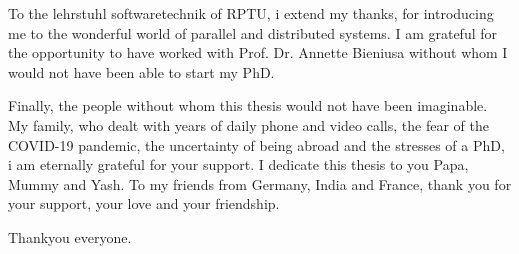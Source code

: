To the lehrstuhl softwaretechnik of RPTU, i extend my thanks, for introducing me to the wonderful world of parallel and distributed systems. I am grateful for the opportunity to have worked with Prof. Dr. Annette Bieniusa without whom I would not have been able to start my PhD.

Finally, the people without whom this thesis would not have been imaginable. My family, who dealt with years of daily phone and video calls, the fear of the COVID-19 pandemic, the uncertainty of being abroad and the stresses of a PhD, i am eternally grateful for your support. I dedicate this thesis to you Papa, Mummy and Yash. To my friends from Germany, India and France, thank you for your support, your love and your friendship.

Thankyou everyone. 